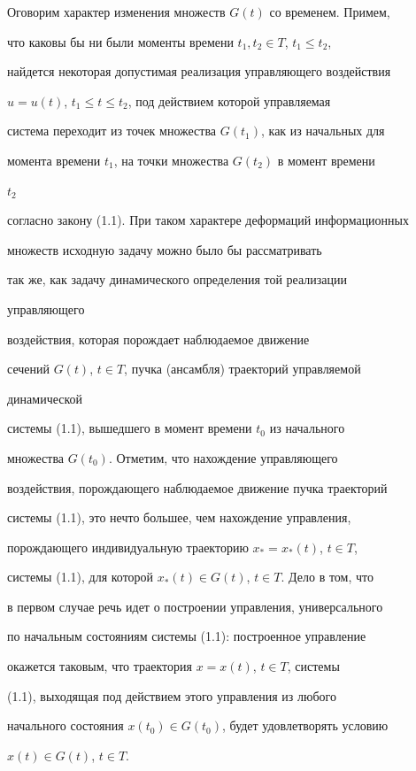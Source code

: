  


Оговорим характер изменения множеств $G(t)$ со временем. Примем, 


что каковы бы ни были моменты времени $t_1,t_2\in T$, $t_1\le t_2$, 


найдется некоторая допустимая реализация управляющего воздействия 


$u=u(t)$, $t_1\le t\le t_2$, под действием которой управляемая 


система переходит из точек множества $G(t_1)$, как из начальных для 


момента времени $t_1$, на точки множества $G(t_2)$ в момент времени 


$t_2$ 


согласно закону (1.1). При таком характере деформаций информационных 


множеств исходную задачу можно было бы рассматривать 


так же, как задачу динамического определения той реализации 


управляющего 


воздействия, которая порождает наблюдаемое движение 


сечений $G(t)$, $t\in T$, пучка (ансамбля) траекторий управляемой 


динамической 


системы (1.1), вышедшего в момент времени $t_0$ из начального 


множества $G(t_0)$. Отметим, что нахождение управляющего 


воздействия, порождающего наблюдаемое движение пучка траекторий 


системы (1.1), это нечто большее, чем нахождение управления, 


порождающего индивидуальную траекторию $x_*=x_*(t)$, $t\in T$, 


системы (1.1), для которой $x_*(t)\in G(t)$, $t\in T$. Дело в том, что 


в первом случае речь идет о построении управления, универсального 


по начальным состояниям системы (1.1): построенное управление 


окажется таковым, что траектория $x=x(t)$, $t\in T$, системы 


(1.1), выходящая под действием этого управления из любого 


начального состояния $x(t_0)\in G(t_0)$, будет удовлетворять условию 


$x(t)\in G(t)$, $t\in T$. 


